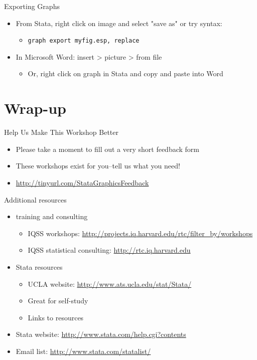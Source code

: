 \documentclass[table,smaller]{beamer}
\begin{document}
\begin{frame}[fragile,label=sec-4-5]{Exporting Graphs}
 \begin{itemize}
\item From Stata, right click on image and select "save as" or try syntax:
\begin{itemize}
\item \texttt{graph export myfig.esp, replace}
\end{itemize}
\item In Microsoft Word: insert > picture > from file
\begin{itemize}
\item Or, right click on graph in Stata and copy and paste into Word
\end{itemize}
\end{itemize}
\end{frame}


\section{Wrap-up}
\label{sec-5}

\begin{frame}[label=sec-5-1]{Help Us Make This Workshop Better}
\begin{itemize}
\item Please take a moment to fill out a very short feedback form
\item These workshops exist for you--tell us what you need!
\item \url{http://tinyurl.com/StataGraphicsFeedback}
\end{itemize}
\end{frame}
\begin{frame}[label=sec-5-2]{Additional resources}
\begin{itemize}
\item training and consulting
\begin{itemize}
\item IQSS workshops: \url{http://projects.iq.harvard.edu/rtc/filter_by/workshops}
\item IQSS statistical consulting: \url{http://rtc.iq.harvard.edu}
\end{itemize}

\item Stata resources
\begin{itemize}
\item UCLA website: \url{http://www.ats.ucla.edu/stat/Stata/}
\item Great for self-study
\item Links to resources
\end{itemize}
\item Stata website: \url{http://www.stata.com/help.cgi?contents}
\item Email list: \url{http://www.stata.com/statalist/}
\end{itemize}
\end{frame}
\end{document}
